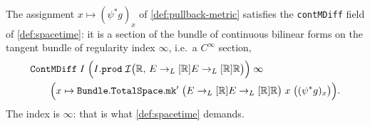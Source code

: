 \begin{lemma}
    \label{lmm:pullback-metric-smooth-in-charts}
    \leanok
    The assignment $x \mapsto (\psi^*g)_x$ of \ref{def:pullback-metric} satisfies the \texttt{contMDiff} field of \ref{def:spacetime}: it is a section of the bundle of continuous bilinear forms on the tangent bundle of regularity index $\infty$, i.e.\ a $C^\infty$ section,
    \begin{align}
        &\mathtt{ContMDiff}\;I\;\Big(I.\mathtt{prod}\;\mathcal{I}\big(\mathbb{R},\, E \to_L[\mathbb{R}] E \to_L[\mathbb{R}] \mathbb{R}\big)\Big)\;\infty \notag \\
        &\qquad \Big(x \mapsto \mathtt{Bundle.TotalSpace.mk'}\;\big(E \to_L[\mathbb{R}] E \to_L[\mathbb{R}] \mathbb{R}\big)\;x\;\big((\psi^*g)_x\big)\Big).
    \end{align}
    The index is $\infty$: that is what \ref{def:spacetime} demands.
\end{lemma}
